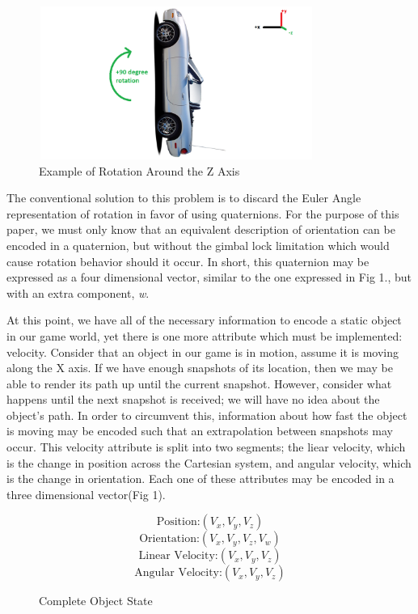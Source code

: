 \documentclass[conference]{IEEEtran}
\begin{document}
\begin{figure}[htbp]
\centerline{\includegraphics [width = 9cm, height = 5cm] {fig2.png}}
\caption{Example of Rotation Around the Z Axis}
\end{figure}

The conventional solution to this problem is to discard the Euler Angle representation of rotation in favor of using quaternions. 
For the purpose of this paper, we must only know that an equivalent description of orientation can be encoded in a quaternion,
but without the gimbal lock limitation which would cause rotation behavior should it occur. In short, this quaternion may be expressed as a four dimensional
vector, similar to the one expressed in Fig 1., but with an extra component, \textit{w}. 

At this point, we have all of the necessary information to encode a static object in our game world, yet there is one more attribute which
must be implemented: velocity. Consider that an object in our game is in motion, assume it is moving along the X axis. If we have enough snapshots of its location,
then we may be able to render its path up until the current snapshot. However, consider what happens until the next snapshot is received; we will have no idea about the object's path. 
In order to circumvent this, information about how fast the object is moving may be encoded such that an extrapolation between snapshots may occur. This velocity attribute 
is split into two segments; the liear velocity, which is the change in position across the Cartesian system, and angular velocity, which is the change in orientation. 
Each one of these attributes may be encoded in a three dimensional vector(Fig 1).

\begin{figure}[htbp]
\begin{equation}
\text {Position:} (V_{x}, V_{y}, V_{z})
\end{equation}
\begin{equation}
\text {Orientation:} (V_{x}, V_{y}, V_{z}, V_{w})
\end{equation}
\begin{equation}
\text {Linear Velocity:} (V_{x}, V_{y}, V_{z})
\end{equation}
\begin{equation}
\text {Angular Velocity:} (V_{x}, V_{y}, V_{z})
\end{equation}
\caption{Complete Object State}
\end{figure}
\end{document}
